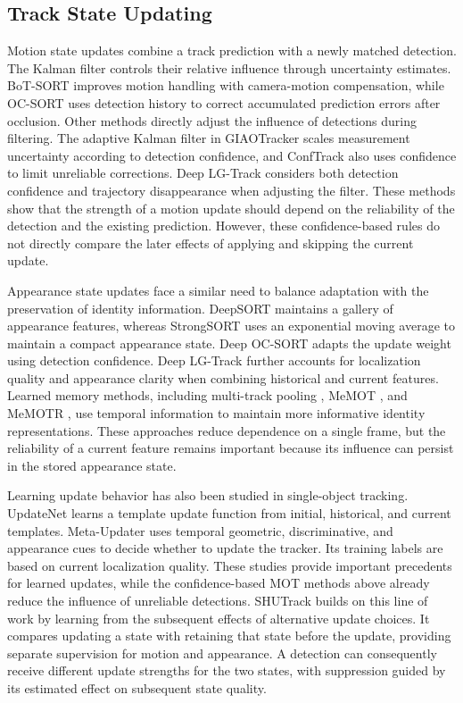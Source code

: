 \documentclass[a4paper,fleqn]{cas-sc}
\begin{document}
\subsection{Track State Updating}
Motion state updates combine a track prediction with a newly matched detection. The Kalman filter \cite{kalman1960new} controls their relative influence through uncertainty estimates. BoT-SORT \cite{aharon2022bot} improves motion handling with camera-motion compensation, while OC-SORT \cite{cao2023observation} uses detection history to correct accumulated prediction errors after occlusion. Other methods directly adjust the influence of detections during filtering. The adaptive Kalman filter in GIAOTracker \cite{du2021giaotracker} scales measurement uncertainty according to detection confidence, and ConfTrack \cite{jung2024conftrack} also uses confidence to limit unreliable corrections. Deep LG-Track \cite{meng2025deep} considers both detection confidence and trajectory disappearance when adjusting the filter. These methods show that the strength of a motion update should depend on the reliability of the detection and the existing prediction. However, these confidence-based rules do not directly compare the later effects of applying and skipping the current update.

Appearance state updates face a similar need to balance adaptation with the preservation of identity information. DeepSORT \cite{wojke2017simple} maintains a gallery of appearance features, whereas StrongSORT \cite{du2023strongsort} uses an exponential moving average to maintain a compact appearance state. Deep OC-SORT \cite{maggiolino2023deep} adapts the update weight using detection confidence. Deep LG-Track \cite{meng2025deep} further accounts for localization quality and appearance clarity when combining historical and current features. Learned memory methods, including multi-track pooling \cite{kim2021discriminative}, MeMOT \cite{cai2022memot}, and MeMOTR \cite{gao2023memotr}, use temporal information to maintain more informative identity representations. These approaches reduce dependence on a single frame, but the reliability of a current feature remains important because its influence can persist in the stored appearance state.

Learning update behavior has also been studied in single-object tracking. UpdateNet \cite{zhang2019learning} learns a template update function from initial, historical, and current templates. Meta-Updater \cite{dai2020high} uses temporal geometric, discriminative, and appearance cues to decide whether to update the tracker. Its training labels are based on current localization quality. These studies provide important precedents for learned updates, while the confidence-based MOT methods above already reduce the influence of unreliable detections. SHUTrack builds on this line of work by learning from the subsequent effects of alternative update choices. It compares updating a state with retaining that state before the update, providing separate supervision for motion and appearance. A detection can consequently receive different update strengths for the two states, with suppression guided by its estimated effect on subsequent state quality.
\end{document}
